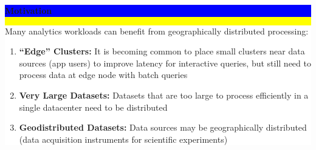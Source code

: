 \documentclass[11pt]{a0poster}
\begin{document}
\noindent\colorbox{Yellow}{
\begin{minipage}[t][2045pt][t]{\linewidth}

\noindent\begin{minipage}{0.025\linewidth}
\hfill
\pagebreak
\end{minipage}
\begin{minipage}{0.3\linewidth}
\vspace{75pt}
\colorbox{Blue}{
\begin{minipage}{\linewidth}
\vspace{25pt}
\begin{center}
\Huge \bf \color{White} Motivation
\end{center}
\vspace{10pt}
\end{minipage}
}
\colorbox{White}{
\begin{minipage}[t][635pt][t]{\linewidth}
\color{Blue}
\vspace{20pt}
\LARGE Many analytics workloads can benefit from geographically \linebreak distributed processing:
\begin{enumerate}
\item {\bf ``Edge'' Clusters:} It is becoming common to place small clusters near data sources (app users)
to improve latency for interactive queries, but still need to process data at edge node with batch queries
\item {\bf Very Large Datasets:} Datasets that are too large to process efficiently in a single datacenter
need to be distributed
\item {\bf Geodistributed Datasets:} Data sources may be \linebreak geographically distributed (data
acquisition instruments for scientific experiments)
\end{enumerate}
\hfill
\pagebreak
\end{minipage}
}


\end{minipage}
\end{minipage}}
\end{document}
